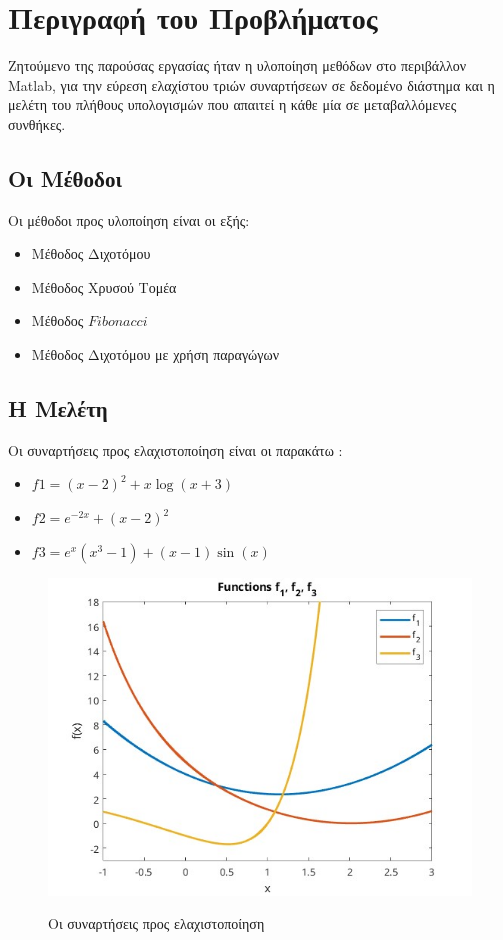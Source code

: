 \chapter{Περιγραφή του Προβλήματος}
\label{ch:chapter1}
Ζητούμενο της παρούσας εργασίας ήταν η υλοποίηση μεθόδων στο περιβάλλον 
Matlab, για την εύρεση ελαχίστου τριών συναρτήσεων σε δεδομένο διάστημα και η μελέτη του πλήθους υπολογισμών που απαιτεί η κάθε μία σε μεταβαλλόμενες συνθήκες. 
\section{Οι Μέθοδοι}
Οι μέθοδοι προς υλοποίηση είναι οι εξής:
\begin{itemize}
    \item Μέθοδος Διχοτόμου
    \item Μέθοδος Χρυσού Τομέα
    \item Μέθοδος $Fibonacci$
    \item Μέθοδος Διχοτόμου με χρήση παραγώγων
\end{itemize}

\section{Η Μελέτη}
Οι συναρτήσεις προς ελαχιστοποίηση είναι οι παρακάτω :
\begin{itemize}
    \item $f1 = (x - 2)^2 + x \log(x + 3)$
    \item $f2 =  e^{-2x} + (x - 2)^2$
    \item $f3 = e^x(x^3 - 1) + (x - 1)\sin(x)$
\end{itemize}

\begin{figure}[H]
    \includegraphics[scale=0.7]{plots/prereqs/funcs.jpg}
    \label{fig:funcs}
    \caption{Οι συναρτήσεις προς ελαχιστοποίηση}
    \centering
\end{figure}

